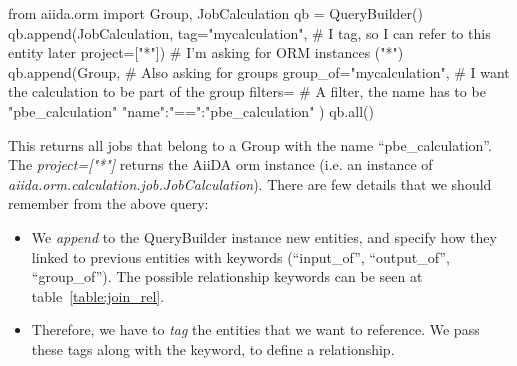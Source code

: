 \begin{pythoncommand}
from aiida.orm import Group, JobCalculation
qb = QueryBuilder()
qb.append(JobCalculation,
        tag="mycalculation",            # I tag, so I can refer to this entity later
        project=["*"])                  # I'm asking for ORM instances ("*")
qb.append(Group,                        # Also asking for groups
        group_of="mycalculation",       # I want the calculation to be part of the group
        filters={                       # A filter, the name has to be "pbe_calculation"
            "name":{"==":"pbe_calculation"}
        })
qb.all()
\end{pythoncommand}
This returns all jobs that belong to a Group with the name ``pbe\_calculation''.
The \emph{project=["*"]} returns the AiiDA orm instance (i.e. an instance of \emph{aiida.orm.calculation.job.JobCalculation}).
%
%
%
There are few details that we should remember from the above query:
\begin{itemize}
\item We \emph{append} to the QueryBuilder instance new entities, and specify how they linked
to previous entities with keywords (``input\_of'', ``output\_of'', ``group\_of'').
The possible relationship keywords can be seen at table~\ref{table:join_rel}.
\item Therefore, we have to \emph{tag} the entities that we want to reference.
We pass these tags along with the keyword, to define a relationship.
\end{itemize}


